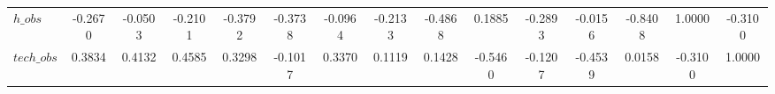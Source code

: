 \begin{center}
\begin{longtable}{lcccccccccccccc}
$h\_obs         $	 & 	          -0.2670	 & 	          -0.0503	 & 	          -0.2101	 & 	          -0.3792	 & 	          -0.3738	 & 	          -0.0964	 & 	          -0.2133	 & 	          -0.4868	 & 	           0.1885	 & 	          -0.2893	 & 	          -0.0156	 & 	          -0.8408	 & 	           1.0000	 & 	          -0.3100 \\ 
$tech\_obs      $	 & 	           0.3834	 & 	           0.4132	 & 	           0.4585	 & 	           0.3298	 & 	          -0.1017	 & 	           0.3370	 & 	           0.1119	 & 	           0.1428	 & 	          -0.5460	 & 	          -0.1207	 & 	          -0.4539	 & 	           0.0158	 & 	          -0.3100	 & 	           1.0000 \\ 
\end{longtable}
 \end{center}
